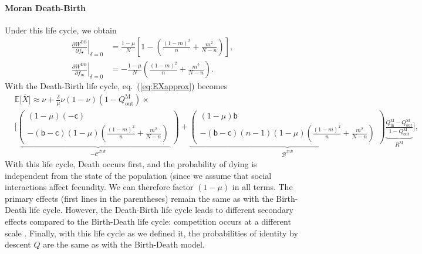 \documentclass[11pt, letterpaper]{article}
\renewcommand{\eqref}[1]{\textup{{\normalfont eq.~(\ref{#1}}\normalfont)}}
\newcommand{\deriv}[2]{\partial_{#2}\!{#1}\,}
\newcommand{\derivv}[3]{\left.\frac{\partial #1}{\partial #2}\right |_{#3=0}} %
\newcommand{\Esp}[1]{\mathbb{E}\big[ #1\big]}%
\newcommand{\bb}{\mathsf{b}}
\newcommand{\cc}{\mathsf{c}}
\newcommand{\Moran}{\textrm{M}}
\newcommand{\DB}{\textrm{DB}}
\newcommand{\mutbias}{\nu}
\newcommand{\inn}{\textrm{in}}
\newcommand{\out}{\textrm{out}}
\newcommand{\focal}{\bullet}
\newcommand{\selstr}{\delta}
\begin{document}
\paragraph{Moran Death-Birth}
Under this life cycle, we obtain
\begin{subequations}\label{eq:dWDB}
\begin{align}
\derivv{W^{\DB}}{f_{\focal}}{\selstr} &= \frac{1-\mu}{N} \left[ 1 - \left( \frac{(1-m)^2}{n} + \frac{m^2}{N-n}  \right) \right],\\
\derivv{W^{\DB}}{f_{\inn}}{\selstr} &= - \frac{1-\mu}{N} \left( \frac{(1-m)^2}{n} + \frac{m^2}{N-n}  \right). 
\end{align}
\end{subequations}
%
%
With the Death-Birth life cycle, \eqref{eq:EXapprox} becomes
%
\begin{equation}\label{eq:EXDB}
\begin{split}
& \Esp{\overline{X}} \approx \mutbias + 
 \frac{\selstr}{\mu}  \mutbias (1-\mutbias) (1 - Q_{\out}^{\Moran}) \times \\
 &\Bigg[ \underbrace{ \begin{pmatrix}
 (1-\mu) (-\cc) \\
- (\bb - \cc) (1-\mu) \left( \frac{(1-m)^2}{n} + \frac{m^2}{N-n}\right) 
 \end{pmatrix}
}_{-\mathcal{C^{\DB}}} + \underbrace{ \begin{pmatrix}
(1-\mu) \bb \\
- (\bb - \cc) (n-1) (1-\mu)\left( \frac{(1-m)^2}{n} + \frac{m^2}{N-n} \right) 
\end{pmatrix}
}_{\mathcal{B^{\DB}}} \underbrace{\frac{Q_{\inn}^{\Moran} - Q_{\out}^{\Moran}}{1 - Q_{\out}^{\Moran}}}_{R^{\Moran}} \Bigg],
\end{split}
\end{equation}
%
With this life cycle, Death occurs first, and the probability of dying is independent from the state of the population (since we assume that social interactions affect fecundity. We can therefore factor $(1-\mu)$ in all terms. The primary effects (first lines in the parentheses) remain the same as with the Birth-Death life cycle. However, the Death-Birth life cycle leads to different secondary effects compared to the Birth-Death life cycle: competition occurs at a different scale \citep{GrafenArchetti2008}.
Finally, with this life cycle as we defined it, the probabilities of identity by descent $Q$ are the same as with the Birth-Death model. 
\end{document}
